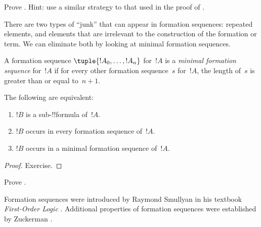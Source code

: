\documentclass[../../../include/open-logic-section]{subfiles}
\begin{document}
\begin{prob}
Prove .
Hint: use a similar strategy to that used in the proof of
.
\end{prob}

There are two types of ``junk'' that can appear in formation
sequences: repeated elements, and elements that are irrelevant
to the construction of the formation or term. We can eliminate
both by looking at minimal formation sequences.

\begin{defn}
A formation sequence $\tuple{!A_0,\dotsc,!A_n}$ for~$!A$ is a
\emph{minimal formation sequence} for~$!A$
if for every other formation sequence~$s$ for~$!A$, the length
of~$s$ is greater than or equal to~$n+1$.
\end{defn}

\begin{prop}
The following are equivalent:
\begin{enumerate}
    \item $!B$ is a sub-!!{formula} of~$!A$.
    \item $!B$ occurs in every formation sequence of~$!A$.
    \item $!B$ occurs in a minimal formation sequence of~$!A$.
\end{enumerate}
\end{prop}

\begin{proof}
Exercise.
\end{proof}

\begin{prob}
Prove .
\end{prob}

\begin{history}
Formation sequences were introduced by Raymond Smullyan in his
textbook \emph{First-Order Logic} \cite{Smullyan1968}.
Additional properties of formation sequences were established by
Zuckerman \cite{Zuckerman1973}.
\end{history}
\end{document}
